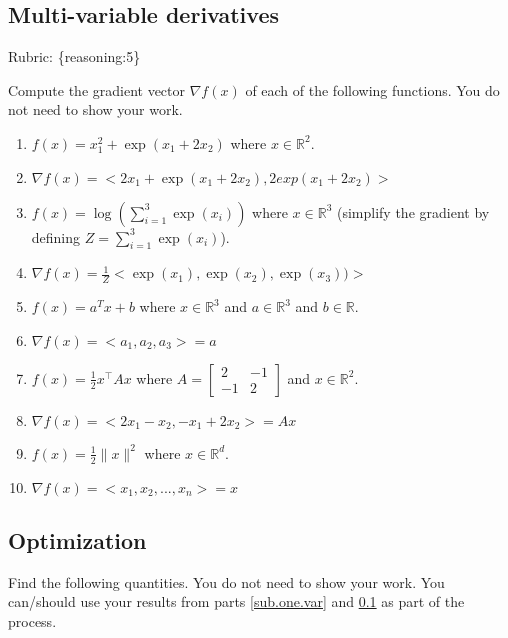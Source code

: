 \documentclass{article}
\def\rubric#1{\gre{Rubric: \{#1\}}}{}
\def\blu#1{{\color{blu}#1}}
\def\gre#1{{\color{gre}#1}}
\def\norm#1{\|#1\|}
\def\R{\mathbb{R}}
\def\half{\frac 1 2}
\begin{document}
\subsection{Multi-variable derivatives}
\label{sub.multi.var}
\rubric{reasoning:5}

\blu{Compute the gradient vector $\nabla f(x)$ of each of the following functions.} You do not need to show your work.
\begin{enumerate}
\item $f(x) = x_1^2 + \exp(x_1 + 2x_2)$ where $x \in \R^2$.
\item[] \gre{$\nabla f(x) = <2x_1 + \exp(x_1 + 2x_2), 2exp(x_1 + 2x_2)>$} 
\item $f(x) = \log\left(\sum_{i=1}^3\exp(x_i)\right)$ where $x \in \R^3$ (simplify the gradient by defining $Z = \sum_{i=1}^3\exp(x_i)$).
\item[] \gre{$\nabla f(x) = \frac{1}{Z}<\exp(x_1), \exp(x_2), \exp(x_3))>$} 
\item $f(x) = a^Tx + b$ where $x \in \R^3$ and $a \in \R^3$ and $b \in \R$.
\item[] \gre{$\nabla f(x) = <a_1, a_2, a_3> = a$} 
\item $f(x) = \half x^\top A x$ where $A=\left[ \begin{array}{cc}
2 & -1 \\
 -1 & 2 \end{array} \right]$ and $x \in \mathbb{R}^2$.
\item[] \gre{$\nabla f(x) = <2x_1 - x_2, -x_1 + 2x_2> = Ax$}
\item $f(x) = \frac{1}{2}\norm{x}^2$ where $x \in \R^d$.
\item[] \gre{$\nabla f(x) = <x_1, x_2,..., x_n> = x$} 
\end{enumerate}

\subsection{Optimization}
\blu{Find the following quantities.} You do not need to show your work. 
You can/should use your results from parts \ref{sub.one.var} and \ref{sub.multi.var} as part of the process.
\end{document}
